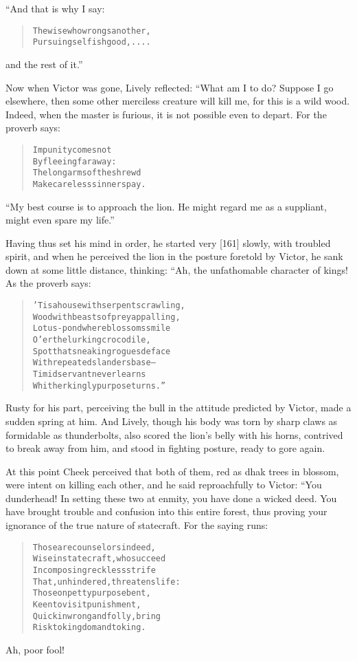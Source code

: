 \documentclass[article, twoside, 14pt]{memoir}
\renewenvironment{verbatim}{%
\begin{quote}%
\vskip -10pt%
\begin{alltt}\normalfont\large}{\end{alltt}%
\end{quote}%
\vskip -10pt
} %
\begin{document}
“And that is why I say:

\begin{verbatim}
The wise who wrongs another,
    Pursuing selfish good, ....
\end{verbatim}
and the rest of it.”

Now when Victor was gone, Lively reflected: “What am I to do?
Suppose I go elsewhere, then some other merciless creature will
kill me, for this is a wild wood. Indeed, when the master is
furious, it is not possible even to depart. For the proverb says:

\begin{verbatim}
Impunity comes not
    By fleeing far away:
The long arms of the shrewd
    Make careless sinners pay.
\end{verbatim}
``My best course is to approach the lion. He might regard me as a suppliant, might even spare my life.''

Having thus set his mind in order, he started very [161] slowly,
with troubled spirit, and when he perceived the lion in the posture
foretold by Victor, he sank down at some little distance, thinking:
“Ah, the unfathomable character of kings! As the proverb says:

\begin{verbatim}
'Tis a house with serpents crawling,
Wood with beasts of prey appalling,
Lotus-pond where blossoms smile
O'er the lurking crocodile,
Spot that sneaking rogues deface
With repeated slanders base--
Timid servant never learns
Whither kingly purpose turns.”
\end{verbatim}
Rusty for his part, perceiving the bull in the attitude predicted
by Victor, made a sudden spring at him. And Lively, though his body
was torn by sharp claws as formidable as thunderbolts, also scored
the lion's belly with his horns, contrived to break away from him,
and stood in fighting posture, ready to gore again.

At this point Cheek perceived that both of them, red as dhak trees
in blossom, were intent on killing each other, and he said
reproachfully to Victor: “You dunderhead! In setting these two at
enmity, you have done a wicked deed. You have brought trouble and
confusion into this entire forest, thus proving your ignorance of
the true nature of statecraft. For the saying runs:

\begin{verbatim}
Those are counselors indeed,
Wise in statecraft, who succeed
In composing reckless strife
That, unhindered, threatens life:
Those on petty purpose bent,
Keen to visit punishment,
Quick in wrong and folly, bring
Risk to kingdom and to king.
\end{verbatim}
Ah, poor fool!
\end{document}
